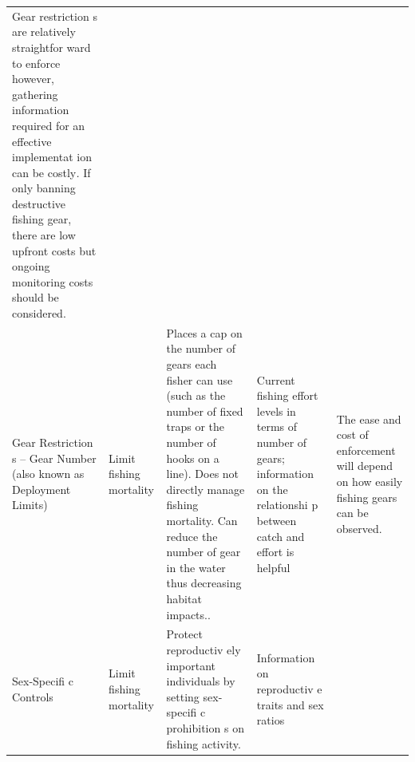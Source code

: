 \documentclass[]{book}
\begin{document}
\begin{longtable}[]{@{}lllll@{}}
\begin{minipage}[t]{0.17\columnwidth}
Gear restriction s are relatively straightfor ward to enforce however,
gathering information required for an effective implementat ion can be
costly\emph{.} If only banning destructive fishing gear, there are low
upfront costs but ongoing monitoring costs should be considered.\strut
\end{minipage}\tabularnewline
\begin{minipage}[t]{0.17\columnwidth}\raggedright\strut
Gear Restriction s -- Gear Number (also known as Deployment
Limits)\strut
\end{minipage} & \begin{minipage}[t]{0.17\columnwidth}\raggedright\strut
Limit fishing mortality\strut
\end{minipage} & \begin{minipage}[t]{0.17\columnwidth}\raggedright\strut
Places a cap on the number of gears each fisher can use (such as the
number of fixed traps or the number of hooks on a line). Does not
directly manage fishing mortality. Can reduce the number of gear in the
water thus decreasing habitat impacts..\strut
\end{minipage} & \begin{minipage}[t]{0.17\columnwidth}\raggedright\strut
Current fishing effort levels in terms of number of gears; information
on the relationshi p between catch and effort is helpful\strut
\end{minipage} & \begin{minipage}[t]{0.17\columnwidth}\raggedright\strut
The ease and cost of enforcement will depend on how easily fishing gears
can be observed.\strut
\end{minipage}\tabularnewline
\begin{minipage}[t]{0.17\columnwidth}\raggedright\strut
Sex-Specifi c Controls\strut
\end{minipage} & \begin{minipage}[t]{0.17\columnwidth}\raggedright\strut
Limit fishing mortality\strut
\end{minipage} & \begin{minipage}[t]{0.17\columnwidth}\raggedright\strut
Protect reproductiv ely important individuals by setting sex-specifi c
prohibition s on fishing activity.\strut
\end{minipage} & \begin{minipage}[t]{0.17\columnwidth}\raggedright\strut
Information on reproductiv e traits and sex ratios\strut
\end{minipage} & \begin{minipage}[t]{0.17\columnwidth}\raggedright\strut

\end{minipage}
\end{longtable}
\end{document}
